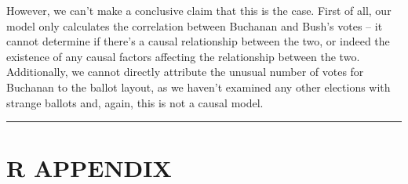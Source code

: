 \documentclass[
  letterpaper,
  DIV=11,
  numbers=noendperiod]{scrartcl}
\begin{document}
However, we can't make a conclusive claim that this is the case. First
of all, our model only calculates the correlation between Buchanan and
Bush's votes -- it cannot determine if there's a causal relationship
between the two, or indeed the existence of any causal factors affecting
the relationship between the two. Additionally, we cannot directly
attribute the unusual number of votes for Buchanan to the ballot layout,
as we haven't examined any other elections with strange ballots and,
again, this is not a causal model.

\begin{center}\rule{0.5\linewidth}{0.5pt}\end{center}

\hypertarget{r-appendix}{%
\section{R APPENDIX}\label{r-appendix}}
\end{document}
